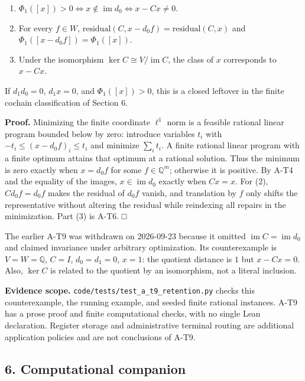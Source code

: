 \documentclass[
  11pt,
]{article}
\providecommand{\tightlist}{%
  \setlength{\itemsep}{0pt}\setlength{\parskip}{0pt}}
\begin{document}
\begin{enumerate}
\def\labelenumi{\arabic{enumi}.}
\tightlist
\item
  \(\Phi_1([x])>0\iff x\notin\operatorname{im}d_0\iff x-Cx\ne0\).
\item
  For every \(f\in W\), \(\mathrm{residual}(C,x-d_0f)=\mathrm{residual}(C,x)\) and \(\Phi_1([x-d_0f])=\Phi_1([x])\).
\item
  Under the isomorphism \(\ker C\cong V/\operatorname{im}C\), the class of \(x\) corresponds to \(x-Cx\).
\end{enumerate}

If \(d_1d_0=0\), \(d_1x=0\), and \(\Phi_1([x])>0\), this is a closed leftover in the finite cochain classification of Section 6.

\textbf{Proof.} Minimizing the finite coordinate \(\ell^1\) norm is a feasible rational linear program bounded below by zero: introduce variables \(t_i\) with \(-t_i\le(x-d_0f)_i\le t_i\) and minimize \(\sum_i t_i\). A finite rational linear program with a finite optimum attains that optimum at a rational solution. Thus the minimum is zero exactly when \(x=d_0f\) for some \(f\in\mathbb Q^m\); otherwise it is positive. By A-T4 and the equality of the images, \(x\in\operatorname{im}d_0\) exactly when \(Cx=x\). For (2), \(Cd_0f=d_0f\) makes the residual of \(d_0f\) vanish, and translation by \(f\) only shifts the representative without altering the residual while reindexing all repairs in the minimization. Part (3) is A-T6. □

The earlier A-T9 was withdrawn on 2026-09-23 because it omitted \(\operatorname{im}C=\operatorname{im}d_0\) and claimed invariance under arbitrary optimization. Its counterexample is \(V=W=\mathbb Q\), \(C=I\), \(d_0=d_1=0\), \(x=1\): the quotient distance is \(1\) but \(x-Cx=0\). Also, \(\ker C\) is related to the quotient by an isomorphism, not a literal inclusion.

\textbf{Evidence scope.} \nolinkurl{code/tests/test_a_t9_retention.py} checks this counterexample, the running example, and seeded finite rational instances. A-T9 has a prose proof and finite computational checks, with no single Lean declaration. Register storage and administrative terminal routing are additional application policies and are not conclusions of A-T9.

\subsection{6. Computational companion}\label{computational-companion}
\end{document}
